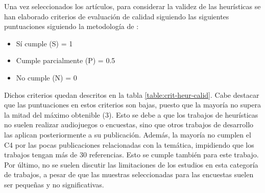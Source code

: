 Una vez seleccionados los artículos, para considerar la validez de las heurísticas se han elaborado criterios de evaluación de calidad siguiendo las siguientes puntuaciones siguiendo la metodología de \cite{romerodesouzaferreyraModelosParaAnalisis2017}: 
\begin{itemize}
	\item Sí cumple (S) = 1
	\item Cumple parcialmente (P) = 0.5
	\item  No cumple (N) = 0
\end{itemize}
Dichos criterios quedan descritos en la tabla \ref{table:crit-heur-calid}. Cabe destacar que las puntuaciones en estos criterios son bajas, puesto que la mayoría no supera la mitad del máximo obtenible (3). Esto se debe a que los trabajos de heurísticas no suelen realizar audiojuegos o encuestas, sino que otros trabajos de desarrollo las aplican posteriormente a su publicación. Además, la mayoría no cumplen el C4 por las pocas publicaciones relacionadas con la temática, impidiendo que los trabajos tengan más de 30 referencias. Esto se cumple también para este trabajo. Por último, no se suelen discutir las limitaciones de los estudios en esta categoría de trabajos, a pesar de que las muestras seleccionadas para las encuestas suelen ser pequeñas y no significativas.\\

